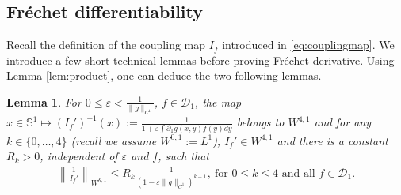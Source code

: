 \documentclass[12pt]{article}
\newcommand{\eps}{\varepsilon}
\theoremstyle{plain}
\newtheorem{lemma}[theorem]{Lemma}
\begin{document}
{\subsection{Fr\'echet differentiability}\label{subsecdiff}
Recall the definition of the coupling map $I_f$ introduced in \eqref{eq:couplingmap}.
We introduce a few short technical lemmas before proving Fr\'echet derivative.
Using Lemma \ref{lem:product}, one can deduce the two following lemmas.
\begin{lemma}\label{lem:boudifprimeinv}
For $0\le \eps< \frac{1}{\|g\|_{C^1}}$, $f\in \mathcal D_1$, the map $x\in \mathbb{S}^1\mapsto (I_f')^{-1}(x):=\frac 1 {1+\eps\int\partial_1g(x,y)f(y)dy}$ belongs to $W^{4,1}$ and for any $k\in \{0,\dots,4\}$ (recall we assume $W^{0,1}:=L^1$), $I_f'\in W^{4,1}$ and there is a constant $R_k>0$, independent of $\eps$ and $f$, such that
\begin{align*}
    \left\| \frac{1}{I_f'} \right\|_{W^{k,1}}\leq R_k \frac{1}{(1-\eps\|g\|_{C^1})^{k+1}},\ \mbox{for $0\le k\le 4$ and all $f\in \mathcal D_1$.}
\end{align*}
\end{lemma}


}
\end{document}
